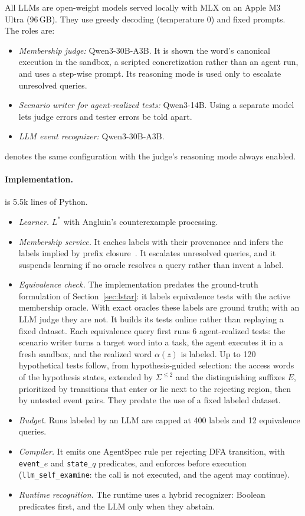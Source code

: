 All LLMs are open-weight models served locally with MLX on an Apple M3 Ultra (96\,GB). They use greedy decoding
(temperature 0) and fixed prompts. The roles are:
\begin{itemize}
  \item \emph{Membership judge:} Qwen3-30B-A3B. It is shown the word's canonical execution in the sandbox, a scripted
  concretization rather than an agent run, and uses a step-wise prompt. Its reasoning mode is used only to escalate unresolved queries.
  \item \emph{Scenario writer for agent-realized tests:} Qwen3-14B. Using a separate model lets judge errors
  and tester errors be told apart.
  \item \emph{LLM event recognizer:} Qwen3-30B-A3B.
\end{itemize}
\systemR{} denotes the same configuration with the judge's reasoning mode always enabled.

\paragraph{Implementation.}
\system{} is 5.5k lines of Python.
\begin{itemize}
  \item \emph{Learner.} $L^*$ with Angluin's counterexample processing.
  \item \emph{Membership service.} It caches labels with their provenance and infers the labels implied by prefix
  closure~\cite{hungar2003domain}. It escalates unresolved queries, and it suspends learning if no oracle resolves a query rather than invent a
  label.
  \item \emph{Equivalence check.} The implementation predates the ground-truth formulation of Section~\ref{sec:lstar}:
  it labels equivalence tests with the active membership oracle. With exact oracles these labels are ground truth;
  with an LLM judge they are not. It builds its tests online rather than replaying a fixed dataset. Each equivalence
  query first runs 6 agent-realized tests: the scenario writer turns a target word into a task, the agent executes it
  in a fresh sandbox, and the realized word $\alpha(z)$ is labeled. Up to 120 hypothetical tests follow, from
  hypothesis-guided selection: the access words of the hypothesis states, extended by $\Sigma^{\le 2}$ and the
  distinguishing suffixes $E$, prioritized by transitions that enter or lie next to the rejecting region, then by
  untested event pairs. They predate the use of a fixed labeled dataset.
  \item \emph{Budget.} Runs labeled by an LLM are capped at 400 labels and 12 equivalence queries.
  \item \emph{Compiler.} It emits one AgentSpec rule per rejecting DFA transition, with \texttt{event\_$e$} and
  \texttt{state\_$q$} predicates, and enforces before execution (\texttt{llm\_self\_examine}: the call is not executed, and the agent may continue).
  \item \emph{Runtime recognition.} The runtime uses a hybrid recognizer: Boolean predicates first, and the LLM only
  when they abstain.
\end{itemize}

